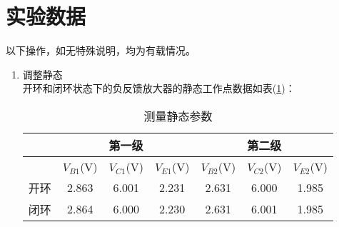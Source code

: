 \documentclass[a4paper]{article}
\begin{document}
\section{实验数据}
以下操作，如无特殊说明，均为有载情况。
\begin{enumerate}
\item 调整静态\\
开环和闭环状态下的负反馈放大器的静态工作点数据如表(\ref{Q})：\\
\begin{table}[!h]
\centering
\caption{测量静态参数}
\label{Q}
\begin{tabular}{|c|c|c|c|c|c|c|}
\hline
   & \multicolumn{3}{c|}{第一级}                & \multicolumn{3}{c|}{第二级}                \\ \hline
   & $V_{B1}$(V) & $V_{C1}$(V) & $V_{E1}$(V) & $V_{B2}$(V) & $V_{C2}$(V) & $V_{E2}$(V) \\ \hline
开环 & 2.863 & 6.001 & 2.231 & 2.631 & 6.000 & 1.985 \\ \hline
闭环 & 2.864 & 6.000 & 2.230 & 2.631 & 6.001 & 1.985 \\ \hline
\end{tabular}
\end{table}


\end{enumerate}
\end{document}
